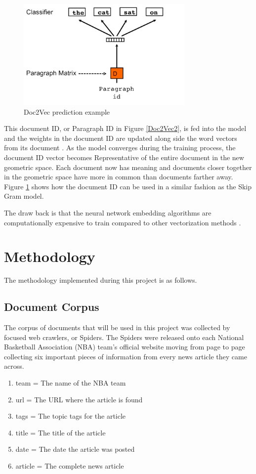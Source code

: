 \documentclass[5p,authoryear]{elsarticle}
\begin{document}
\begin{figure}[!h] 
    \centering
	\includegraphics[width=3.4in]{figures/doc2vec_3.png}
	\caption[]{Doc2Vec prediction example} 
	\label{Doc2Vec3} 
\end{figure}


This document ID, or Paragraph ID in Figure \ref{Doc2Vec2}, is fed into the model and the weights in the document ID are updated along side the word vectors from its document \citep{doc2vec}. 
As the model converges during the training process, the document ID vector becomes Representative of the entire document in the new geometric space. 
Each document now has meaning and documents closer together in the geometric space have more in common than documents farther away. 
Figure \ref{Doc2Vec3} shows how the document ID can be used in a similar fashion as the Skip Gram model.

The draw back is that the neural network embedding algorithms are computationally expensive to train compared to other vectorization methods \citep{lane}. 

\section{Methodology}\label{meth}


The methodology implemented during this project is as follows. 


\subsection{Document Corpus}\label{corpus}

The corpus of documents that will be used in this project was collected by focused web crawlers, or Spiders. The Spiders were released onto each National Basketball Association (NBA) team's official website moving from page to page collecting six important pieces of information from every news article they came across.

\begin{enumerate}
 \item team  = The name of the NBA team
 \item url = The URL where the article is found
 \item tags = The topic tags for the article
 \item title = The title of the article
 \item date = The date the article was posted
 \item article = The complete news article
\end{enumerate} \\
\end{document}
